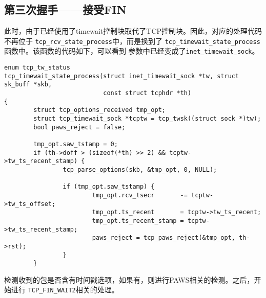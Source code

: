 \subsection{第三次握手——接受FIN}
此时，由于已经使用了timewait控制块取代了TCP控制块。因此，对应的处理代码不再位于
\texttt{tcp_rcv_state_process}中，而是换到了
\texttt{tcp_timewait_state_process}函数中。该函数的代码如下，可以看到
参数中已经变成了\texttt{inet_timewait_sock}。
\begin{verbatim}
enum tcp_tw_status
tcp_timewait_state_process(struct inet_timewait_sock *tw, struct sk_buff *skb,
                           const struct tcphdr *th)
{
        struct tcp_options_received tmp_opt;
        struct tcp_timewait_sock *tcptw = tcp_twsk((struct sock *)tw);
        bool paws_reject = false;

        tmp_opt.saw_tstamp = 0;
        if (th->doff > (sizeof(*th) >> 2) && tcptw->tw_ts_recent_stamp) {
                tcp_parse_options(skb, &tmp_opt, 0, NULL);

                if (tmp_opt.saw_tstamp) {
                        tmp_opt.rcv_tsecr       -= tcptw->tw_ts_offset;
                        tmp_opt.ts_recent       = tcptw->tw_ts_recent;
                        tmp_opt.ts_recent_stamp = tcptw->tw_ts_recent_stamp;
                        paws_reject = tcp_paws_reject(&tmp_opt, th->rst);
                }
        }
\end{verbatim}
检测收到的包是否含有时间戳选项，如果有，则进行PAWS相关的检测。之后，开始进行
\texttt{TCP_FIN_WAIT2}相关的处理。
